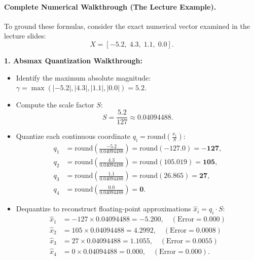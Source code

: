 \documentclass[../../../main.tex]{subfiles}
\begin{document}
\paragraph{Complete Numerical Walkthrough (The Lecture Example).}
To ground these formulas, consider the exact numerical vector examined in the lecture slides:
\begin{equation}
X = [-5.2, \; 4.3, \; 1.1, \; 0.0].
\end{equation}

\noindent\textbf{1. Absmax Quantization Walkthrough:}
\begin{itemize}
    \item Identify the maximum absolute magnitude: $\gamma = \max(|-5.2|, |4.3|, |1.1|, |0.0|) = 5.2$.
    \item Compute the scale factor $S$:
    \begin{equation}
    S = \frac{5.2}{127} \approx 0.04094488.
    \end{equation}
    \item Quantize each continuous coordinate $q_i = \text{round}\left(\frac{x_i}{S}\right)$:
    \begin{align}
    q_1 &= \text{round}\left(\frac{-5.2}{0.04094488}\right) = \text{round}(-127.0) = \mathbf{-127}, \\
    q_2 &= \text{round}\left(\frac{4.3}{0.04094488}\right) = \text{round}(105.019) = \mathbf{105}, \\
    q_3 &= \text{round}\left(\frac{1.1}{0.04094488}\right) = \text{round}(26.865) = \mathbf{27}, \\
    q_4 &= \text{round}\left(\frac{0.0}{0.04094488}\right) = \mathbf{0}.
    \end{align}
    \item Dequantize to reconstruct floating-point approximations $\hat{x}_i = q_i \cdot S$:
    \begin{align}
    \hat{x}_1 &= -127 \times 0.04094488 = -5.200, \quad (\text{Error} = 0.000) \\
    \hat{x}_2 &= 105 \times 0.04094488 = 4.2992, \quad (\text{Error} = 0.0008) \\
    \hat{x}_3 &= 27 \times 0.04094488 = 1.1055, \quad (\text{Error} = 0.0055) \\
    \hat{x}_4 &= 0 \times 0.04094488 = 0.000, \quad (\text{Error} = 0.000).
    \end{align}
\end{itemize}
\end{document}
